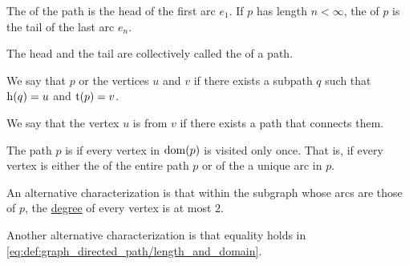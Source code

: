 \begin{definition}
\begin{thmenum}
     The  of the path is the head of the first arc \( e_1 \). If \( p \) has length \( n < \infty \), the  of \( p \) is the tail of the last arc \( e_n \).

    The head and the tail are collectively called the  of a path.

     We say that \( p \)  or  the vertices \( u \) and \( v \) if there exists a subpath \( q \) such that \( \operatorname{h}(q) = u \) and \( \operatorname{t}(p) = v \).

    We say that the vertex \( u \) is  from \( v \) if there exists a path that connects them.

     The path \( p \) is  if every vertex in \( \operatorname{dom}(p) \) is visited only once. That is, if every vertex is either the  of the entire path \( p \) or of the  a unique arc in \( p \).

    An alternative characterization is that within the subgraph whose arcs are those of \( p \), the \hyperref[def:graph_incidence/degree]{degree} of every vertex is at most \( 2 \).

    Another alternative characterization is that equality holds in \eqref{eq:def:graph_directed_path/length_and_domain}.
  \end{thmenum}
\end{definition}

